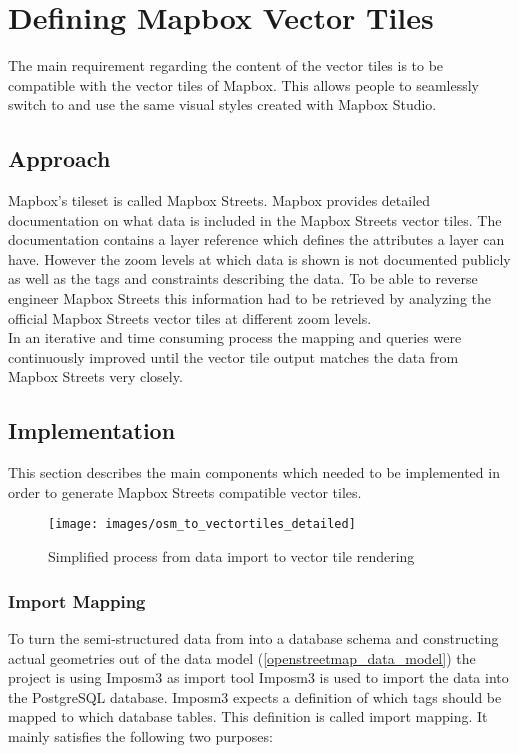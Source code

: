 \chapter{Defining Mapbox Vector Tiles}\label{chapter_defining_mapbox_vector_tiles}

The main requirement regarding the content of the vector tiles is to be compatible with the vector tiles of Mapbox. This allows people to seamlessly switch to \osmvt{} and use the same visual styles created with Mapbox Studio. 

\section{Approach}
Mapbox's tileset is called Mapbox Streets. Mapbox provides detailed documentation on what data is included in the Mapbox Streets vector tiles. The documentation contains a layer reference which defines the attributes a layer can have. However the zoom levels at which data is shown is not documented publicly as well as the \osm{} tags and constraints describing the data. To be able to reverse engineer Mapbox Streets this information had to be retrieved by analyzing the official Mapbox Streets vector tiles at different zoom levels.\\
In an iterative and time consuming process the mapping and queries were continuously improved until the vector tile output matches the data from Mapbox Streets very closely.

\section{Implementation}
This section describes the main components which needed to be implemented in order to generate Mapbox Streets compatible vector tiles.

\begin{figure}[H]
\centering
\texttt{[image: images/osm\_to\_vectortiles\_detailed]}
\caption{Simplified process from data import to vector tile rendering}
\end{figure}

\clearpage

\subsection{Import Mapping}

To turn the semi-structured  data from \osm{} into a database schema and constructing actual geometries out of the \osm{} data model (\autoref{openstreetmap_data_model}) the \osmvt{} project is using Imposm3 as import tool  
Imposm3 is used to import the \osm{} data into the PostgreSQL database. Imposm3 expects a definition of which \osm{} tags should be mapped to which database tables. This definition is called import mapping. It mainly satisfies the following two purposes:

